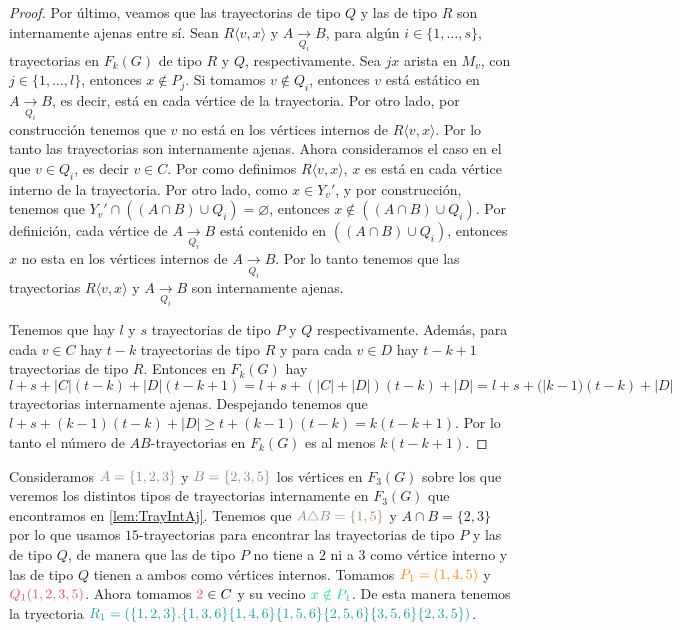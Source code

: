 \begin{proof}
    Por \'ultimo, veamos que las trayectorias de tipo $Q$ y las de tipo $R$ son
    internamente ajenas entre s\'i. Sean $R\langle v,x \rangle$ y $A
    \xrightarrow[Q_i]{}  B$, para alg\'un $i \in \{1, \dots, s\}$, trayectorias
    en $F_k(G)$ de tipo $R$ y $Q$, respectivamente. Sea $jx$ arista en $M_v$,
    con $j \in \{1, \dots, l\}$, entonces $x \notin P_j$. Si tomamos $v \notin
    Q_i$, entonces $v$ est\'a est\'atico en $A \xrightarrow[Q_i]{} B$, es decir,
    est\'a en cada v\'ertice de la trayectoria. Por otro lado, por
    construcci\'on tenemos que $v$ no est\'a en los v\'ertices internos de $R
    \langle v, x \rangle$. Por lo tanto las trayectorias son internamente
    ajenas. Ahora consideramos el caso en el que $v \in Q_i$, es decir $v \in
    C$. Por como definimos $R \langle v,x \rangle$, $x$ es est\'a en cada
    v\'ertice interno de la trayectoria. Por otro lado, como $x \in Y_v'$, y por
    construcci\'on, tenemos que $Y_v ' \cap ((A\cap B) \cup Q_i) = \varnothing$,
    entonces $x \notin ((A \cap B) \cup Q_i)$. Por definici\'on, cada v\'ertice
    de $A \xrightarrow[Q_i]{}  B$ est\'a contenido en $((A \cap B) \cup Q_i)$,
    entonces $x$ no esta en los v\'ertices internos de $A \xrightarrow[Q_i]{}
    B$. Por lo tanto tenemos que las trayectorias $R \langle v,x \rangle$ y $A
    \xrightarrow[Q_i]{}  B$ son internamente ajenas.

    Tenemos que hay $l$ y $s$ trayectorias de tipo $P$ y $Q$ respectivamente.
    Adem\'as, para cada $v \in C$ hay $t-k$ trayectorias de tipo $R$ y para cada
    $v \in D$ hay $t-k+1$ trayectorias de tipo $R$. Entonces en $F_k(G)$ hay $l+
    s+ |C|(t-k)+ |D|(t-k +1) = l + s + (|C| + |D|)(t-k) + |D| = l + s +
    (|k-1)(t-k) + |D|$ trayectorias internamente ajenas. Despejando tenemos que
    $l + s + (k-1)(t-k) + |D| \geq t+ (k-1)(t-k) = k (t -k +1)$. Por lo tanto el
    n\'umero de $AB$-trayectorias en $F_k(G)$ es al menos $k(t-k+1)$.
\end{proof}

Consideramos ${\color{baige}A= \{1,2,3\}}$ y ${\color{baige}B=\{2,3,5\}}$ los
v\'ertices en $F_3(G)$ sobre los que veremos los distintos tipos de trayectorias
internamente en $F_3(G)$ que encontramos en \cref{lem:TrayIntAj}. Tenemos que
${\color{baige}A\triangle B=\{1,5\}}$ y $A\cap B=\{2,3\}$ por lo que usamos
$15$-trayectorias para encontrar las trayectorias de tipo $P$ y las de tipo $Q$,
de manera que las de tipo $P$ no tiene a $2$ ni a $3$ como v\'ertice interno y
las de tipo $Q$ tienen a ambos como v\'ertices internos. Tomamos
${\color{naranja}P_1=(1,4,5)}$ y ${\color{fushia}Q_1(1,2,3,5)}$. Ahora tomamos
${\color{fushia}2} \in C$ y su vecino ${\color{menta}x\notin P_1}$. De esta
manera tenemos la tryectoria
${\color{verdeAzulado}R_1=(\{1,2,3\}.\{1,3,6\}\{1,4,6\}\{1,5,6\}\{2,5,6\}\{3,5,6\}\{2,3,5\})}$.


